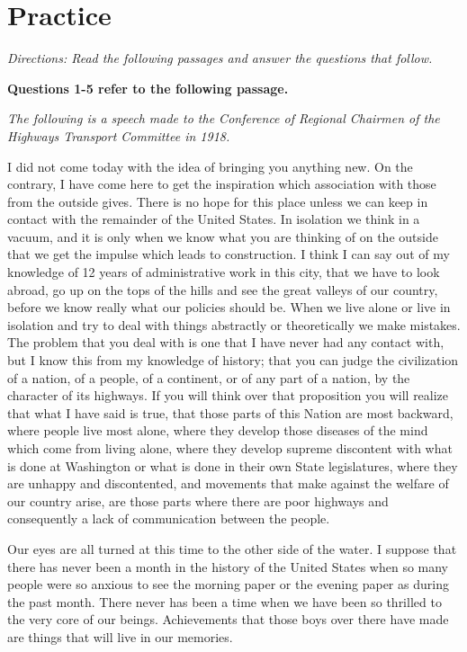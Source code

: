 \section{Practice}

\textit{Directions: Read the following passages and answer the questions that follow.}

\bigskip
\textbf{Questions 1-5 refer to the following passage.}

\bigskip

\textit{The following is a speech made to the Conference of Regional Chairmen of the Highways Transport Committee in 1918.}

\begin{linenumbers}
\modulolinenumbers[5]
\indent I did not come today with the idea of bringing you anything new. On the contrary, I have come here to get the inspiration which association with those from the outside gives. There is no hope for this place unless we can keep in contact with the remainder of the United States. In isolation we think in a vacuum, and it is only when we know what you are thinking of on the outside that we get the impulse which leads to construction. I think I can say out of my knowledge of 12 years of administrative work in this city, that we have to look abroad, go up on the tops of the hills and see the great valleys of our country, before we know really what our policies should be. When we live alone or live in isolation and try to deal with things abstractly or theoretically we make mistakes.
The problem that you deal with is one that I have never had any contact with, but I know this from my knowledge of history; that you can judge the civilization of a nation, of a people, of a continent, or of any part of a nation, by the character of its highways. If you will think over that proposition you will realize that what I have said is true, that those parts of this Nation are most backward, where people live most alone, where they develop those diseases of the mind which come from living alone, where they develop supreme discontent with what is done at Washington or what is done in their own State legislatures, where they are unhappy and discontented, and movements that make against the welfare of our country arise, are those parts where there are poor highways and consequently a lack of communication between the people.

\indent Our eyes are all turned at this time to the other side of the water. I suppose that there has never been a month in the history of the United States when so many people were so anxious to see the morning paper or the evening paper as during the past month. There never has been a time when we have been so thrilled to the very core of our beings. Achievements that those boys over there have made are things that will live in our memories.


\end{linenumbers}
